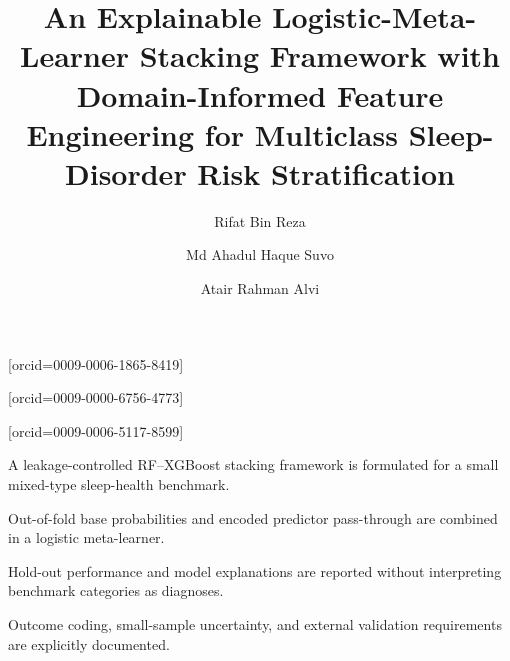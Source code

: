 \documentclass[a4paper,fleqn]{cas-dc}
\begin{document}
\raggedbottom
{}
\title[mode=title]{An Explainable Logistic-Meta-Learner Stacking Framework with Domain-Informed Feature Engineering for Multiclass Sleep-Disorder Risk Stratification}
\author[1]{Rifat Bin Reza}[orcid=0009-0006-1865-8419]
\cormark[1]
\author[2]{Md Ahadul Haque Suvo}[orcid=0009-0000-6756-4773]
\author[1]{Atair Rahman Alvi}[orcid=0009-0006-5117-8599]
\address[1]{BSRM School of Engineering, Department of Electrical and Electronics Engineering, Brac University, Dhaka, Bangladesh\label{affa}}
\address[2]{Aviation and Aerospace University, Department of Avionics Engineering, Dhaka, Bangladesh}
\begin{highlights}
\item A leakage-controlled RF--XGBoost stacking framework is formulated for a small mixed-type sleep-health benchmark.
\item Out-of-fold base probabilities and encoded predictor pass-through are combined in a logistic meta-learner.
\item Hold-out performance and model explanations are reported without interpreting benchmark categories as diagnoses.
\item Outcome coding, small-sample uncertainty, and external validation requirements are explicitly documented.
\end{highlights}
\end{document}
